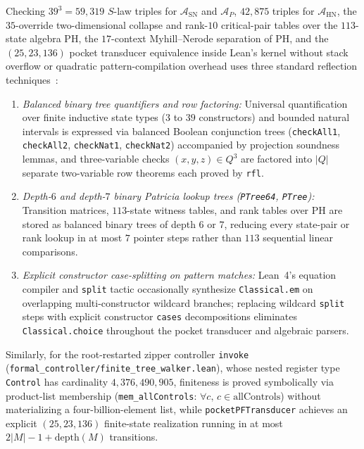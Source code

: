 \documentclass[11pt,reqno]{amsart}
\numberwithin{equation}{section}
\theoremstyle{plain}
\theoremstyle{definition}
\theoremstyle{remark}
\begin{document}
Checking $39^3 = 59{,}319$ $S$-law triples for $\mathcal{A}_{\mathrm{SN}}$ and $\mathcal{A}_P$, $42{,}875$ triples for $\mathcal{A}_{\mathrm{HN}}$, the $35$-override two-dimensional collapse and rank-$10$ critical-pair tables over the $113$-state algebra $\mathrm{PH}$, the $17$-context Myhill--Nerode separation of $\mathrm{PH}$, and the $(25, 23, 136)$ pocket transducer equivalence inside Lean's kernel without stack overflow or quadratic pattern-compilation overhead uses three standard reflection techniques~\cite{Gonthier2008FourColor}:
\begin{enumerate}[label=(\arabic*),leftmargin=2.2em]
\item \emph{Balanced binary tree quantifiers and row factoring:} Universal quantification over finite inductive state types ($3$ to $39$ constructors) and bounded natural intervals is expressed via balanced Boolean conjunction trees (\texttt{checkAll1}, \texttt{checkAll2}, \texttt{checkNat1}, \texttt{checkNat2}) accompanied by projection soundness lemmas, and three-variable checks $(x, y, z) \in Q^3$ are factored into $|Q|$ separate two-variable row theorems each proved by \texttt{rfl}.
\item \emph{Depth-$6$ and depth-$7$ binary Patricia lookup trees (\texttt{PTree64}, \texttt{PTree}):} Transition matrices, $113$-state witness tables, and rank tables over $\mathrm{PH}$ are stored as balanced binary trees of depth $6$ or $7$, reducing every state-pair or rank lookup in at most $7$ pointer steps rather than $113$ sequential linear comparisons.
\item \emph{Explicit constructor case-splitting on pattern matches:} Lean~4's equation compiler and \texttt{split} tactic occasionally synthesize \texttt{Classical.em} on overlapping multi-constructor wildcard branches; replacing wildcard \texttt{split} steps with explicit constructor \texttt{cases} decompositions eliminates \texttt{Classical.choice} throughout the pocket transducer and algebraic parsers.
\end{enumerate}
Similarly, for the root-restarted zipper controller \texttt{invoke} (\texttt{formal\_controller/finite\_tree\_walker.lean}), whose nested register type \texttt{Control} has cardinality $4{,}376{,}490{,}905$, finiteness is proved symbolically via product-list membership (\texttt{mem\_allControls}: $\forall c,\, c \in \mathrm{allControls}$) without materializing a four-billion-element list, while \texttt{pocketPFTransducer} achieves an explicit $(25, 23, 136)$ finite-state realization running in at most $2|M| - 1 + \mathrm{depth}(M)$ transitions.
\end{document}
